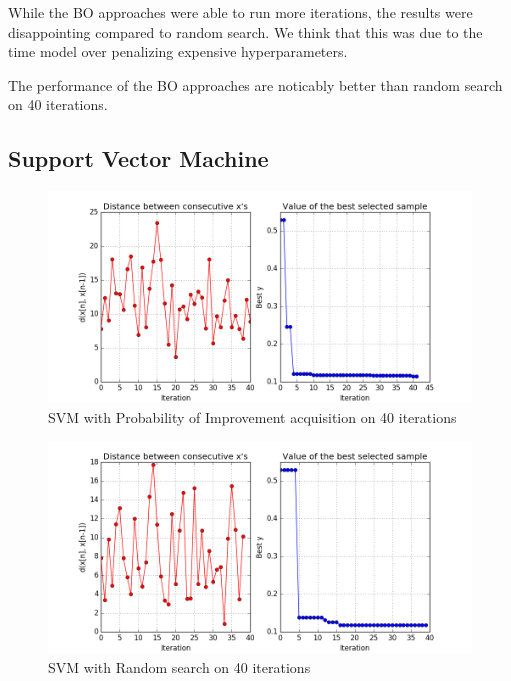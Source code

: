 \documentclass[letterpaper]{article}
\begin{document}
While the BO approaches were able to run more iterations, the results were disappointing compared to random search.
We think that this was due to the time model over penalizing expensive hyperparameters.

The performance of the BO approaches are noticably better than random search on 40 iterations.

\subsection {Support Vector Machine}
\begin{figure}[h]
	\includegraphics[width=\linewidth]{EIX_SVM_X_init2_NC_ITER40.png}
	\caption{SVM with Probability of Improvement acquisition on 40 iterations}
\end{figure}
\vfill\eject
\begin{figure}[h]
	\includegraphics[width=\linewidth]{RAND_SVM_X_init2_NC_ITER40.png}
	\caption{SVM with Random search on 40 iterations}
\end{figure}
\end{document}
